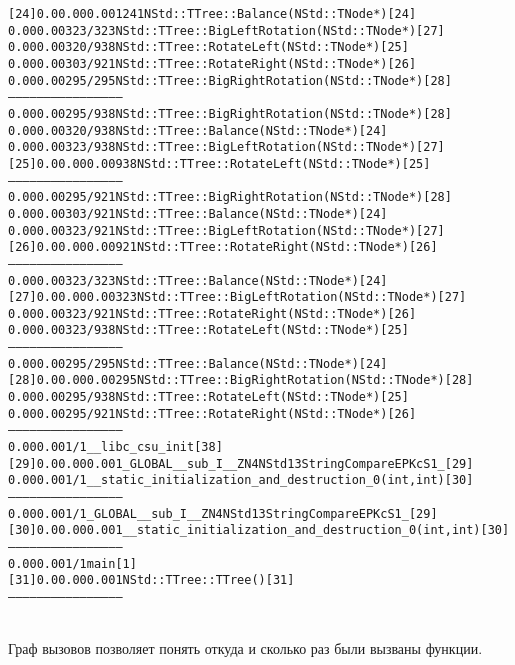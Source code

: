 \begin{alltt}
[24]     0.0    0.00    0.00    1241         NStd::TTree::Balance(NStd::TNode*) [24]
                0.00    0.00     323/323         NStd::TTree::BigLeftRotation(NStd::TNode*) [27]
                0.00    0.00     320/938         NStd::TTree::RotateLeft(NStd::TNode*) [25]
                0.00    0.00     303/921         NStd::TTree::RotateRight(NStd::TNode*) [26]
                0.00    0.00     295/295         NStd::TTree::BigRightRotation(NStd::TNode*) [28]
-----------------------------------------------
                0.00    0.00     295/938         NStd::TTree::BigRightRotation(NStd::TNode*) [28]
                0.00    0.00     320/938         NStd::TTree::Balance(NStd::TNode*) [24]
                0.00    0.00     323/938         NStd::TTree::BigLeftRotation(NStd::TNode*) [27]
[25]     0.0    0.00    0.00     938         NStd::TTree::RotateLeft(NStd::TNode*) [25]
-----------------------------------------------
                0.00    0.00     295/921         NStd::TTree::BigRightRotation(NStd::TNode*) [28]
                0.00    0.00     303/921         NStd::TTree::Balance(NStd::TNode*) [24]
                0.00    0.00     323/921         NStd::TTree::BigLeftRotation(NStd::TNode*) [27]
[26]     0.0    0.00    0.00     921         NStd::TTree::RotateRight(NStd::TNode*) [26]
-----------------------------------------------
                0.00    0.00     323/323         NStd::TTree::Balance(NStd::TNode*) [24]
[27]     0.0    0.00    0.00     323         NStd::TTree::BigLeftRotation(NStd::TNode*) [27]
                0.00    0.00     323/921         NStd::TTree::RotateRight(NStd::TNode*) [26]
                0.00    0.00     323/938         NStd::TTree::RotateLeft(NStd::TNode*) [25]
-----------------------------------------------
                0.00    0.00     295/295         NStd::TTree::Balance(NStd::TNode*) [24]
[28]     0.0    0.00    0.00     295         NStd::TTree::BigRightRotation(NStd::TNode*) [28]
                0.00    0.00     295/938         NStd::TTree::RotateLeft(NStd::TNode*) [25]
                0.00    0.00     295/921         NStd::TTree::RotateRight(NStd::TNode*) [26]
-----------------------------------------------
                0.00    0.00       1/1           __libc_csu_init [38]
[29]     0.0    0.00    0.00       1         _GLOBAL__sub_I__ZN4NStd13StringCompareEPKcS1_ [29]
                0.00    0.00       1/1           __static_initialization_and_destruction_0(int, int) [30]
-----------------------------------------------
                0.00    0.00       1/1           _GLOBAL__sub_I__ZN4NStd13StringCompareEPKcS1_ [29]
[30]     0.0    0.00    0.00       1         __static_initialization_and_destruction_0(int, int) [30]
-----------------------------------------------
                0.00    0.00       1/1           main [1]
[31]     0.0    0.00    0.00       1         NStd::TTree::TTree() [31]
-----------------------------------------------
\end{alltt}
\\ Граф вызовов позволяет понять откуда и сколько раз были вызваны функции.

